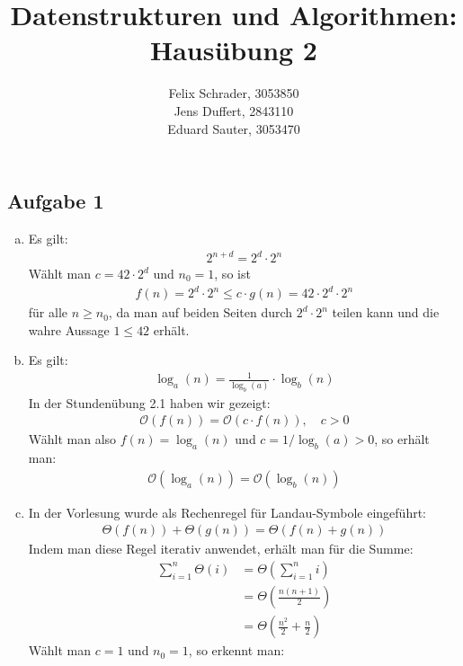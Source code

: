 \documentclass[11pt]{article}
\author{
  Felix Schrader, 3053850 \\ 
  Jens Duffert, 2843110 \\
  Eduard Sauter, 3053470
}
\title{Datenstrukturen und Algorithmen: Haus\"ubung 2}
\begin{document}
\maketitle

\subsection*{Aufgabe 1}

\begin{enumerate}[(a)]
  \item Es gilt:
    \begin{align*}
      2^{n+d} = 2^d \cdot 2^n
    \end{align*}
    Wählt man $c = 42 \cdot 2^d$ und $n_0 = 1$, so ist
    \begin{align*}
      f(n)=2^d \cdot 2^n \leq c \cdot g(n) = 42 \cdot 2^d \cdot 2^n
    \end{align*}
    für alle $n \geq n_0$, da man auf beiden Seiten durch $2^d \cdot 2^n$ teilen
    kann und die wahre Aussage $1 \leq 42$ erhält.
  \item Es gilt:
    \begin{align*}
      \log_a (n) = \frac{1}{\log_b (a)} \cdot \log_b (n)
    \end{align*}
    In der Stundenübung 2.1 haben wir gezeigt:
    \begin{align*}
      \mathcal{O}(f(n)) = \mathcal{O}(c \cdot f(n)), \quad c > 0
    \end{align*}
    Wählt man also $f(n) = \log_a (n)$ und $c = 1/\log_b (a) > 0$, so
    erhält man:
    \begin{align*}
      \mathcal{O}(\log_a (n)) = \mathcal{O}(\log_b (n))
    \end{align*}
  \item In der Vorlesung wurde als Rechenregel für Landau-Symbole eingeführt:
    \begin{align*}
      \Theta (f(n)) + \Theta (g(n)) = \Theta (f(n)+g(n))
    \end{align*}
    Indem man diese Regel iterativ anwendet, erhält man für die Summe:
    \begin{align*}
      \sum_{i=1}^n \Theta (i) &= \Theta \left(\sum_{i=1}^n i\right)
      \\ &= \Theta \left(\frac{n(n+1)}{2}\right)
      \\ &= \Theta \left(\frac{n^2}{2} + \frac{n}{2}\right)
    \end{align*}
    Wählt man $c = 1$ und $n_0 = 1$, so erkennt man:
    \begin{align*}

\end{align*}
\end{enumerate}
\end{document}

